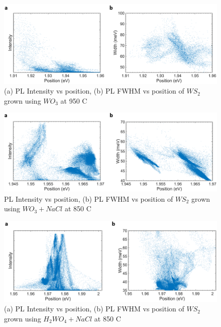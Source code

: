 \documentclass[12pt]{article}
\begin{document}
{\begin{figure}[h]
\begin{center}
\includegraphics[scale=0.3]{PaperSIScatterWO3.png}
\caption{(a) PL Intensity vs position, (b) PL FWHM vs position of $WS_2$ grown using $WO_3$ at 950 {\degree}C}
\label{fig:PaperSIScatterWO3}
\end{center}
\end{figure}

\begin{figure}[h]
\begin{center}
\includegraphics[scale=0.3]{PaperSIScatterWO3NaCl.png}
\caption{PL Intensity vs position, (b) PL FWHM vs position of $WS_2$ grown using $WO_3+NaCl$ at 850 {\degree}C}
\label{fig:PaperSIScatterWO3NaCl}
\end{center}
\end{figure}

\begin{figure}[h]
\begin{center}
\includegraphics[scale=0.3]{PaperSIScatterH2WO4NaCl.png}
\caption{(a) PL Intensity vs position, (b) PL FWHM vs position of $WS_2$ grown using $H_2WO_4+NaCl$ at 850 {\degree}C}
\label{fig:PaperSIScatterH2WO4NaCl}
\end{center}
\end{figure}

}
\end{document}
